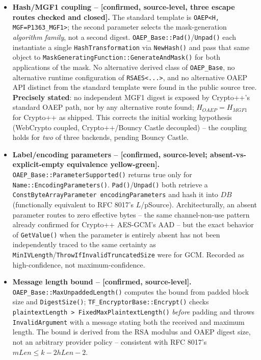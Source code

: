 \documentclass[11pt,a4paper]{article}
\begin{document}
\begin{itemize}
\item \textbf{Hash/MGF1 coupling -- [confirmed, source-level, three escape routes checked and closed].} The standard template is \texttt{OAEP<H, MGF=P1363\_MGF1>}; the second parameter selects the mask-generation \emph{algorithm family}, not a second digest. \texttt{OAEP\_Base::Pad()}/\texttt{Unpad()} each instantiate a single \texttt{HashTransformation} via \texttt{NewHash()} and pass that same object to \texttt{MaskGeneratingFunction::GenerateAndMask()} for both applications of the mask. No alternative derived class of \texttt{OAEP\_Base}, no alternative runtime configuration of \texttt{RSAES<...>}, and no alternative OAEP API distinct from the standard template were found in the public source tree. \textbf{Precisely stated}: no independent MGF1 digest is exposed by Crypto++'s standard OAEP path, nor by any alternative route found; $H_{OAEP} = H_{MGF1}$ for Crypto++ as shipped. This corrects the initial working hypothesis (WebCrypto coupled, Crypto++/Bouncy Castle decoupled) -- the coupling holds for \emph{two} of three backends, pending Bouncy Castle.
\item \textbf{Label/encoding parameters -- [confirmed, source-level; absent-vs-explicit-empty equivalence yellow-green].} \texttt{OAEP\_Base::ParameterSupported()} returns true only for \texttt{Name::EncodingParameters()}. \texttt{Pad()}/\texttt{Unpad()} both retrieve a \texttt{ConstByteArrayParameter encodingParameters} and hash it into $DB$ (functionally equivalent to RFC 8017's $L$/pSource). Architecturally, an absent parameter routes to zero effective bytes -- the same channel-non-use pattern already confirmed for Crypto++ AES-GCM's AAD -- but the exact behavior of \texttt{GetValue()} when the parameter is entirely absent has not been independently traced to the same certainty as \texttt{MinIVLength}/\texttt{ThrowIfInvalidTruncatedSize} were for GCM. Recorded as high-confidence, not maximum-confidence.
\item \textbf{Message length bound -- [confirmed, source-level].} \texttt{OAEP\_Base::MaxUnpaddedLength()} computes the bound from padded block size and \texttt{DigestSize()}; \texttt{TF\_EncryptorBase::Encrypt()} checks \texttt{plaintextLength > FixedMaxPlaintextLength()} \emph{before} padding and throws \texttt{InvalidArgument} with a message stating both the received and maximum length. The bound is derived from the RSA modulus and OAEP digest size, not an arbitrary provider policy -- consistent with RFC 8017's $mLen \le k - 2hLen-2$.

\end{itemize}
\end{document}
